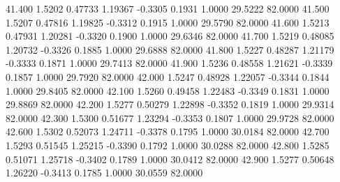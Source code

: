   41.400   1.5202   0.47733   1.19367  -0.3305   0.1931   1.0000  29.5222  82.0000
  41.500   1.5207   0.47816   1.19825  -0.3312   0.1915   1.0000  29.5790  82.0000
  41.600   1.5213   0.47931   1.20281  -0.3320   0.1900   1.0000  29.6346  82.0000
  41.700   1.5219   0.48085   1.20732  -0.3326   0.1885   1.0000  29.6888  82.0000
  41.800   1.5227   0.48287   1.21179  -0.3333   0.1871   1.0000  29.7413  82.0000
  41.900   1.5236   0.48558   1.21621  -0.3339   0.1857   1.0000  29.7920  82.0000
  42.000   1.5247   0.48928   1.22057  -0.3344   0.1844   1.0000  29.8405  82.0000
  42.100   1.5260   0.49458   1.22483  -0.3349   0.1831   1.0000  29.8869  82.0000
  42.200   1.5277   0.50279   1.22898  -0.3352   0.1819   1.0000  29.9314  82.0000
  42.300   1.5300   0.51677   1.23294  -0.3353   0.1807   1.0000  29.9728  82.0000
  42.600   1.5302   0.52073   1.24711  -0.3378   0.1795   1.0000  30.0184  82.0000
  42.700   1.5293   0.51545   1.25215  -0.3390   0.1792   1.0000  30.0288  82.0000
  42.800   1.5285   0.51071   1.25718  -0.3402   0.1789   1.0000  30.0412  82.0000
  42.900   1.5277   0.50648   1.26220  -0.3413   0.1785   1.0000  30.0559  82.0000
